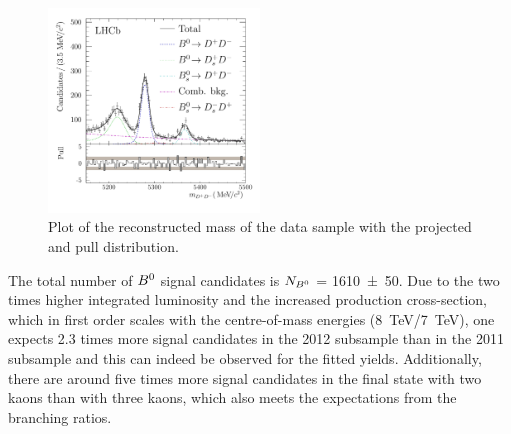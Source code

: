 \begin{figure}[htb]
\centering
\includegraphics[width=0.5\textwidth]{07-B02DD/tikz/pdf/obsMass_summed_pull.pdf}
\caption{Plot of the reconstructed mass of the \BdToDD data sample with the
projected \PDF and pull distribution.
}
\label{fig:massfit}
\end{figure}

The total number of ${{B}^0}$ signal candidates is $N_{{{B}^0}}$ = \num{1610\pm50}.
Due to the two times higher integrated luminosity and the increased production
cross-section, which in first order scales with the centre-of-mass energies
(\SI{8}{\TeV}/\SI{7}{\TeV}), one expects \num{2.3} times more signal
candidates in the 2012 subsample than in the 2011 subsample and this can
indeed be observed for the fitted yields. Additionally, there are around five
times more signal candidates in the final state with two kaons than with three
kaons, which also meets the expectations from the branching ratios.

\FloatBarrier